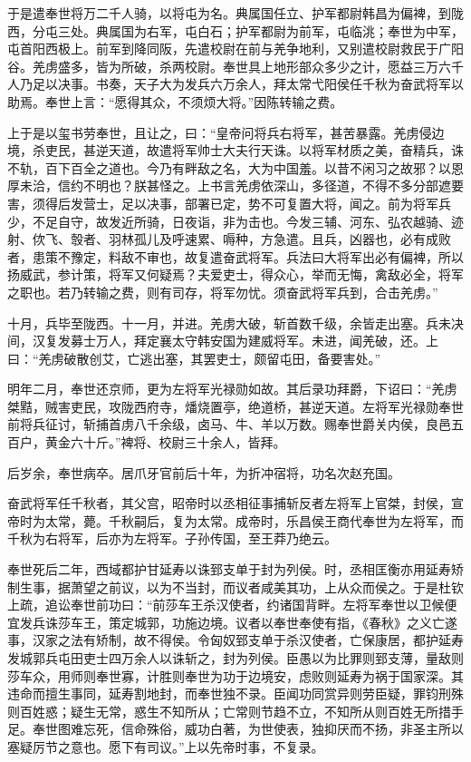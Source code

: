 \documentclass[]{article}
\begin{document}
于是遣奉世将万二千人骑，以将屯为名。典属国任立、护军都尉韩昌为偏裨，到陇西，分屯三处。典属国为右军，屯白石；护军都尉为前军，屯临洮；奉世为中军，屯首阳西极上。前军到降同阪，先遣校尉在前与羌争地利，又别遣校尉救民于广阳谷。羌虏盛多，皆为所破，杀两校尉。奉世具上地形部众多少之计，愿益三万六千人乃足以决事。书奏，天子大为发兵六万余人，拜太常弋阳侯任千秋为奋武将军以助焉。奉世上言：``愿得其众，不须烦大将。''因陈转输之费。

上于是以玺书劳奉世，且让之，曰：``皇帝问将兵右将军，甚苦暴露。羌虏侵边境，杀吏民，甚逆天道，故遣将军帅士大夫行天诛。以将军材质之美，奋精兵，诛不轨，百下百全之道也。今乃有畔敌之名，大为中国羞。以昔不闲习之故邪？以恩厚未洽，信约不明也？朕甚怪之。上书言羌虏依深山，多径道，不得不多分部遮要害，须得后发营士，足以决事，部署已定，势不可复置大将，闻之。前为将军兵少，不足自守，故发近所骑，日夜诣，非为击也。今发三辅、河东、弘农越骑、迹射、佽飞、彀者、羽林孤儿及呼速累、嗕种，方急遣。且兵，凶器也，必有成败者，患策不豫定，料敌不审也，故复遣奋武将军。兵法曰大将军出必有偏裨，所以扬威武，参计策，将军又何疑焉？夫爱吏士，得众心，举而无悔，禽敌必全，将军之职也。若乃转输之费，则有司存，将军勿忧。须奋武将军兵到，合击羌虏。''

十月，兵毕至陇西。十一月，并进。羌虏大破，斩首数千级，余皆走出塞。兵未决间，汉复发募士万人，拜定襄太守韩安国为建威将军。未进，闻羌破，还。上曰：``羌虏破散创艾，亡逃出塞，其罢吏士，颇留屯田，备要害处。''

明年二月，奉世还京师，更为左将军光禄勋如故。其后录功拜爵，下诏曰：``羌虏桀黠，贼害吏民，攻陇西府寺，燔烧置亭，绝道桥，甚逆天道。左将军光禄勋奉世前将兵征讨，斩捕首虏八千余级，卤马、牛、羊以万数。赐奉世爵关内侯，良邑五百户，黄金六十斤。''裨将、校尉三十余人，皆拜。

后岁余，奉世病卒。居爪牙官前后十年，为折冲宿将，功名次赵充国。

奋武将军任千秋者，其父宫，昭帝时以丞相征事捕斩反者左将军上官桀，封侯，宣帝时为太常，薨。千秋嗣后，复为太常。成帝时，乐昌侯王商代奉世为左将军，而千秋为右将军，后亦为左将军。子孙传国，至王莽乃绝云。

奉世死后二年，西域都护甘延寿以诛郅支单于封为列侯。时，丞相匡衡亦用延寿矫制生事，据萧望之前议，以为不当封，而议者咸美其功，上从众而侯之。于是杜钦上疏，追讼奉世前功曰：``前莎车王杀汉使者，约诸国背畔。左将军奉世以卫候便宜发兵诛莎车王，策定城郭，功施边境。议者以奉世奉使有指，《春秋》之义亡遂事，汉家之法有矫制，故不得侯。令匈奴郅支单于杀汉使者，亡保康居，都护延寿发城郭兵屯田吏士四万余人以诛斩之，封为列侯。臣愚以为比罪则郅支薄，量敌则莎车众，用师则奉世寡，计胜则奉世为功于边境安，虑败则延寿为祸于国家深。其违命而擅生事同，延寿割地封，而奉世独不录。臣闻功同赏异则劳臣疑，罪钧刑殊则百姓惑；疑生无常，惑生不知所从；亡常则节趋不立，不知所从则百姓无所措手足。奉世图难忘死，信命殊俗，威功白著，为世使表，独抑厌而不扬，非圣主所以塞疑厉节之意也。愿下有司议。''上以先帝时事，不复录。
\end{document}
